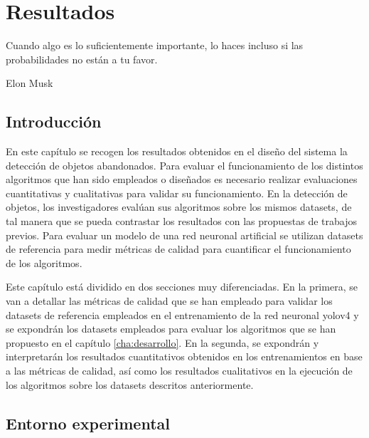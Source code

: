 
\chapter{Resultados}
\label{cha:resultados}

\begin{FraseCelebre}
  \begin{Frase}
    Cuando algo es lo suficientemente importante, lo haces incluso si las probabilidades no están a tu favor.
  \end{Frase}
  \begin{Fuente}
    Elon Musk
  \end{Fuente}
\end{FraseCelebre}

\section{Introducción}
\label{sec:intro-resultados}

En este capítulo se recogen los resultados obtenidos en el diseño del sistema la detección de objetos abandonados. Para evaluar el funcionamiento de los distintos algoritmos que han sido empleados o diseñados es necesario realizar evaluaciones cuantitativas y cualitativas para validar su funcionamiento. En la detección de objetos, los investigadores evalúan sus algoritmos sobre los mismos datasets, de tal manera que se pueda contrastar los resultados con las propuestas de trabajos previos. Para evaluar un modelo de una red neuronal artificial se utilizan datasets de referencia para medir métricas de calidad para cuantificar el funcionamiento de los algoritmos.

Este capítulo está dividido en dos secciones muy diferenciadas. En la primera, se van a detallar las métricas de calidad que se han empleado para validar los datasets de referencia empleados en el entrenamiento de la red neuronal \gls{yolov4} y se expondrán los datasets empleados para evaluar los algoritmos que se han propuesto en el capítulo \ref{cha:desarrollo}. En la segunda, se expondrán y interpretarán los resultados cuantitativos obtenidos en los entrenamientos en base a las métricas de calidad, así como los resultados cualitativos en la ejecución de los algoritmos sobre los datasets descritos anteriormente.

\section{Entorno experimental}
\label{sec:desarrollo-resultados}


